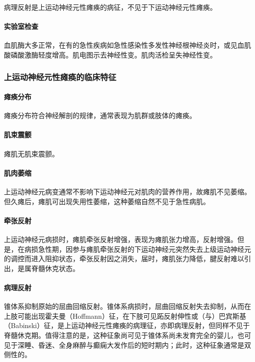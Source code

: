 病理反射是上运动神经元性瘫痪的病征，不见于下运动神经元性瘫痪。

\paragraph{实验室检查}

血肌酶大多正常，在有的急性疾病如急性感染性多发性神经根神经炎时，或见血肌酸磷酸激酶轻度增高。肌电图示去神经性变。肌肉活检呈失神经性变。

\subsubsection{上运动神经元性瘫痪的临床特征}

\paragraph{瘫痪分布}

瘫痪分布符合神经解剖的规律，通常表现为肌群或肢体的瘫痪。

\paragraph{肌束震颤}

瘫肌无肌束震颤。

\paragraph{肌肉萎缩}

上运动神经元病变通常不影响下运动神经元对肌肉的营养作用，故瘫肌不见萎缩。但久瘫后，瘫肌可出现失用性萎缩，这种萎缩自然不见于急性病肌。

\paragraph{牵张反射}

上运动神经元病损时，瘫肌牵张反射增强，表现为瘫肌张力增高，反射增强。但是，在病损急性期，因参与瘫肌牵张反射的下运动神经元突然失去上级运动神经元的调控而进入阻抑状态，牵张反射因之消失，届时，瘫肌张力降低，腱反射难以引出，是属脊髓休克状态。

\paragraph{病理反射}

锥体系抑制原始的屈曲回缩反射。锥体系病损时，屈曲回缩反射失去抑制，从而在上肢可能出现霍夫曼（Hoffmann）征，在下肢可见跖反射伸性或（与）巴宾斯基（Babinski）征，是上运动神经元性瘫痪的病理征，亦即病理反射，但同样不见于脊髓休克期。值得注意的是，这种征象尚可见于锥体系尚未发育完全的婴儿，也可见于深睡、昏迷、全身麻醉与癫痫大发作后的短时期内；此时，这种征象通常是双侧性的。

